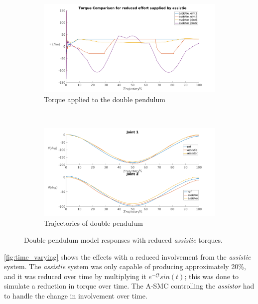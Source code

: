 \begin{figure}[h!]
    \centering
    \begin{subfigure}{0.5\textwidth}
        \centering
        \includegraphics[width=\linewidth]{images/controllers/reduced_torque.png}
        \caption[Double Pendulum: Reduced Torque-Effort]{Torque applied to the double pendulum}
        \label{fig:reduced_effort_torque}
    \end{subfigure}%
    ~
    \begin{subfigure}{0.5\textwidth}
        \centering
        \includegraphics[width=\linewidth]{images/controllers/reduced_traj.png}
        \caption[Double Pendulum: Reduced Torque-Trajectory]{Trajectories of double pendulum}
        \label{fig:reduced_effort_traj}
    \end{subfigure}
    \caption[Double Pendulum: Reduced Torque]{Double pendulum model responses with reduced \textit{assistie} torques.}
    \label{fig:reduced_effort}
\end{figure}

\autoref{fig:time_varying} shows the effects with a reduced involvement from the \textit{assistie} system. The \textit{assistie} system was only capable of producing approximately 20\%, and it was reduced over time by multiplying it $e^{-\xi t}sin(t)$; this was done to simulate a reduction in torque over time. The A-SMC controlling the \textit{assistor} had to handle the change in involvement over time. 

